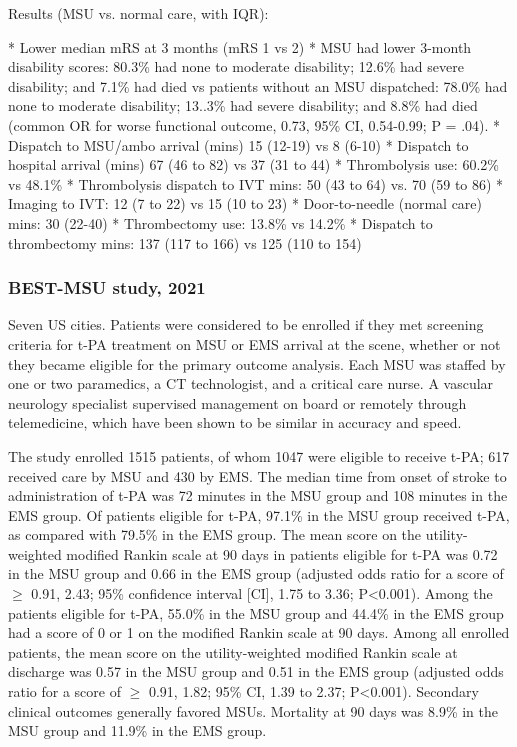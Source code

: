 Results (MSU vs. normal care, with IQR):

\begin{markdown}
* Lower median mRS at 3 months (mRS 1 vs 2)
* MSU had lower 3-month  disability scores: 80.3\% had none to moderate disability; 12.6\% had severe disability; and 7.1\% had died vs patients without an MSU dispatched: 78.0\% had none to moderate disability; 13..3\% had severe disability; and 8.8\% had died (common OR for worse functional outcome, 0.73, 95\% CI, 0.54-0.99; P = .04).
* Dispatch to MSU/ambo arrival (mins) 15 (12-19) vs 8 (6-10)
* Dispatch to hospital arrival (mins) 67 (46 to 82) vs 37 (31 to 44)
* Thrombolysis use: 60.2\% vs 48.1\%
* Thrombolysis dispatch to IVT mins: 50 (43 to 64) vs. 70 (59 to 86)
* Imaging to IVT: 12 (7 to 22) vs 15 (10 to 23)
* Door-to-needle (normal care) mins: 30 (22-40)
* Thrombectomy use: 13.8\% vs 14.2\%
* Dispatch to thrombectomy mins: 137 (117 to 166) vs 125 (110 to 154)
\end{markdown}

\subsubsection{BEST-MSU study, 2021 \cite{grotta_prospective_2021}}

Seven US cities. Patients were considered to be enrolled if they met screening criteria for t-PA treatment on MSU or EMS arrival at the scene, whether or not they became eligible for the primary outcome analysis. Each MSU was staffed by one or two paramedics, a CT technologist, and a critical care nurse. A vascular neurology specialist supervised management on board or remotely through telemedicine, which have been shown to be similar in accuracy and speed.

The study enrolled 1515 patients, of whom 1047 were eligible to receive t-PA; 617 received care by MSU and 430 by EMS. The median time from onset of stroke to administration of t-PA was 72 minutes in the MSU group and 108 minutes in the EMS group. Of patients eligible for t-PA, 97.1\% in the MSU group received t-PA, as compared with 79.5\% in the EMS group. The mean score on the utility-weighted modified Rankin scale at 90 days in patients eligible for t-PA was 0.72 in the MSU group and 0.66 in the EMS group (adjusted odds ratio for a score of $\ge$ 0.91, 2.43; 95\% confidence interval [CI], 1.75 to 3.36; P<0.001). Among the patients eligible for t-PA, 55.0\% in the MSU group and 44.4\% in the EMS group had a score of 0 or 1 on the modified Rankin scale at 90 days. Among all enrolled patients, the mean score on the utility-weighted modified Rankin scale at discharge was 0.57 in the MSU group and 0.51 in the EMS group (adjusted odds ratio for a score of  $\ge$ 0.91, 1.82; 95\% CI, 1.39 to 2.37; P<0.001). Secondary clinical outcomes generally favored MSUs. Mortality at 90 days was 8.9\% in the MSU group and 11.9\% in the EMS group.

